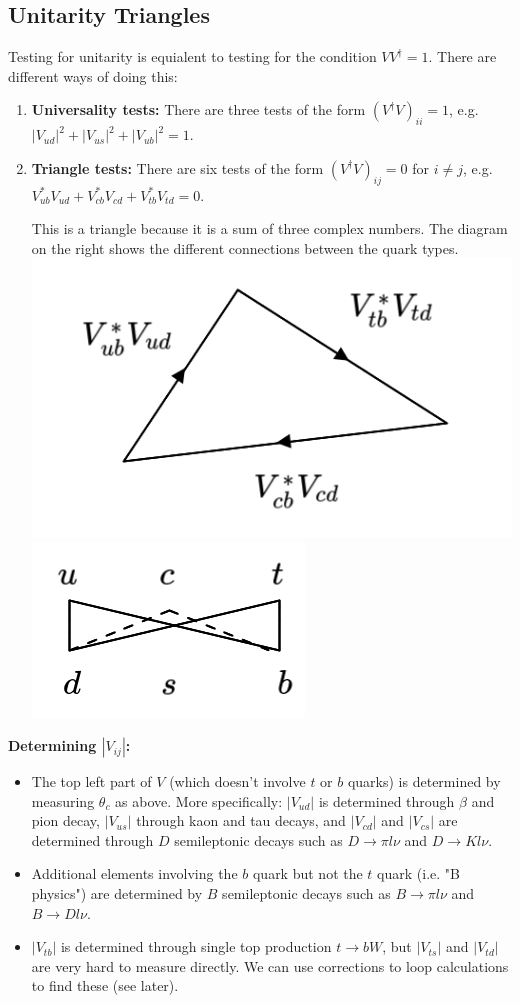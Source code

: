 \subsection{Unitarity Triangles}
%
Testing for unitarity is equialent to testing for the condition $VV^\dagger =1$. There are different ways of doing this:
\begin{enumerate}
\item \textbf{Universality tests: }
There are three tests of the form $(V^\dagger V)_{ii}=1$, e.g.
$|V_{ud}|^2 +|V_{us}|^2 +|V_{ub}|^2 = 1$.
\item \textbf{Triangle tests: }
There are six tests of the form $(V^\dagger V)_{ij}=0$ for $i \neq j$, e.g.
$V^*_{ub}V_{ud} + V^*_{cb}V_{cd} + V^*_{tb}V_{td} = 0$. 

This is a triangle because it is a sum of three complex numbers. The diagram on the right shows the different connections between the quark types.
\newline
\includegraphics[width=0.6\linewidth]{figs/47a.png}
\includegraphics[width=0.3\linewidth]{figs/47b.png}
\end{enumerate}
\textbf{Determining $|V_{ij}|$: }
\begin{itemize}
\item The top left part of $V$ (which doesn't involve $t$ or $b$ quarks) is determined by measuring $\theta_c$ as above. More specifically: $|V_{ud}|$ is determined through $\beta$ and pion decay, $|V_{us}|$ through kaon and tau decays, and $|V_{cd}|$ and $|V_{cs}|$ are determined through $D$ semileptonic decays such as $D \to \pi l \nu$ and $D \to K l \nu$.
\item Additional elements involving the $b$ quark but not the $t$ quark (i.e. "B physics") are determined by $B$ semileptonic decays such as $B \to \pi l \nu$ and $B \to D l \nu$. 
\item $|V_{tb}|$ is determined through single top production $t \to bW$, but $|V_{ts}|$ and $|V_{td}|$ are very hard to measure directly. We can use corrections to loop calculations to find these (see later).
\end{itemize}
